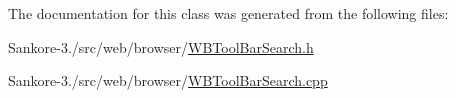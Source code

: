 The documentation for this class was generated from the following files\-:\begin{DoxyCompactItemize}
\item 
Sankore-\/3./src/web/browser/\hyperlink{_w_b_tool_bar_search_8h}{W\-B\-Tool\-Bar\-Search.\-h}\item 
Sankore-\/3./src/web/browser/\hyperlink{_w_b_tool_bar_search_8cpp}{W\-B\-Tool\-Bar\-Search.\-cpp}\end{DoxyCompactItemize}
